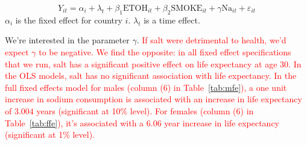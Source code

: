 \documentclass[11pt]{article}\usepackage[]{graphicx}\usepackage[]{color}
\newcommand{\eps}{\varepsilon}
\begin{document}
$$Y_{it} = \alpha_i + \lambda_t + \beta_1\text{ETOH}_{it} +  \beta_2\text{SMOKE}_{it} + \gamma\text{Na}_{it} + \eps_{it}$$
$\alpha_i$ is the fixed effect for country $i$.
$\lambda_t$ is a time effect.

We're interested in the parameter $\gamma$.
\textcolor{red}{If salt were detrimental to health, we'd expect $\gamma$ to be negative.
We find the opposite: in all fixed effect specifications that we run, salt has a significant positive effect on life expectancy at age 30.
In the OLS models, salt has no significant association with life expectancy.
In the full fixed effects model for males (column (6) in Table~\ref{tab:mfe}), a one unit increase in sodium consumption is associated with an increase in life expectancy of $3.004$ years (significant at 10\% level).
For females (column (6) in Table~\ref{tab:ffe}), it's associated with a $6.06$ year increase in life expectancy (significant at 1\% level).}
\end{document}

